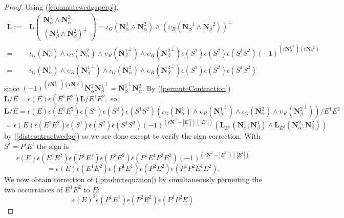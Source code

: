\documentclass[Unicode]{cedram-alco}
\newcommand{\ext}[1]{\ensuremath{\mathbf{#1}}}
\newcommand{\Is}{\ensuremath{\iota}}
\newcommand{\Vs}{\ensuremath{\upsilon}}
\newcommand{\LHorSub}[3]{\ext{L}_{#1}\left(  {#2}; {#3}  \right)}
\begin{document}
\begin{proof}

Using (\ref{commutewedgeperp}),
\begin{equation*}
  \begin{split}
    \ext{L} := & \ext{L}\left(
    \begin{array}{c}
      \ext{N}^{1}_\alpha\wedge \ext{N}^{2}_\alpha
      \\     
      (\ext{N}^{1}_\beta\wedge\ext{N}^{2}_\beta)^\perp
    \end{array} \right)
  =\Is_G(\ext{N}_\alpha^{1}\wedge \ext{N}_\alpha^{2})
  \wedge\left(\Vs_R({\ext{N}_\beta}^{1}\wedge{\ext{N}_\beta}^{2})\right)^\perp
  \\
  =&
  \Is_G(\ext{N}_\alpha^{1})\wedge \Is_G(\ext{N}_\alpha^{2})
  \wedge\Vs_R({\ext{N}_\beta^{1}}^\perp)\wedge\Vs_R({\ext{N}_\beta^{2}}^\perp)
  \epsilon(S^{1})\epsilon(S^{2})\epsilon(S^{1}S^{2})(-1)^{(r{\ext{N}_\beta^{1}}^\perp)( r{\ext{N}_\beta}^{2})}
  \\
  =& 
    \Is_G(\ext{N}_\alpha^{1}) \wedge \Vs_R({\ext{N}_\beta^{1}}^\perp) \wedge
    \Is_G(\ext{N}_\alpha^{2}) \wedge \Vs_R({\ext{N}_\beta^{2}}^\perp)
    \epsilon(S^{1})\epsilon(S^{2})\epsilon(S^{1}S^{2})
  \end{split}
\end{equation*}
since $(-1)^{(r{\ext{N}_\beta^{1}}^\perp)( r{\ext{N}_\beta}^{2})} \ext{N}_\alpha^{2} {\ext{N}_\beta^{1}}^\perp
={\ext{N}_\beta^{1}}^\perp \ext{N}_\alpha^{2}$.  By (\ref{permuteContraction})
$
\ext{L}/E = \epsilon(E)\epsilon(E^{1} E^{2})\ext{L}/E^{1}E^{2},
$ so
\[
\ext{L}/E = \epsilon(E)\epsilon(E^{1} E^{2})\epsilon(S^{1})\epsilon(S^{2})\epsilon(S^{1}S^{2})
\left(
 \Is_G(\ext{N}_\alpha^{1}) \wedge \Vs_R({\ext{N}_\beta^{1}}^\perp) \wedge
    \Is_G(\ext{N}_\alpha^{2}) \wedge \Vs_R({\ext{N}_\beta^{2}}^\perp)
\right)/E^1E^2
\]
\[
=\epsilon(E)\epsilon(E^{1} E^{2})\epsilon(S^{1})\epsilon(S^{2})\epsilon(S^{1}S^{2})
(-1)^{(r\ext{N}^2-|E^2|)(|E^1|)}
\left(\LHorSub{E^{1}}{\ext{N}_\alpha^{1}}{\ext{N}_\beta^{1}}
        \wedge
        \LHorSub{E^{2}}{\ext{N}_\alpha^{2}}{\ext{N}_\beta^{2}}
          \right)
          \]
by (\ref{distcontractwedge}) so we are done except to verify the sign correction.  With $S^i=P^iE^i$ the sign is
\[
\epsilon(E)\epsilon(E^{1} E^{2})\epsilon(P^1E^1)\epsilon(P^{2}E^2)\epsilon(P^1E^1P^2E^2)
(-1)^{(r\ext{N}^2-|E^2|)(|E^1|)}
\]
\[
=\epsilon(E)\epsilon(E^{1} E^{2})\epsilon(P^1E^1)\epsilon(P^{2}E^2)\epsilon(P^1P^2E^1E^2).
\]
We now obtain correction of (\ref{productequation}) by simultaneously permuting the two occurrances of $E^1E^2$
to $E$:
\[
\epsilon(E)^2\epsilon(P^1E^1)\epsilon(P^{2}E^2)\epsilon(P^1P^2E)
\]



\end{proof}
\end{document}
